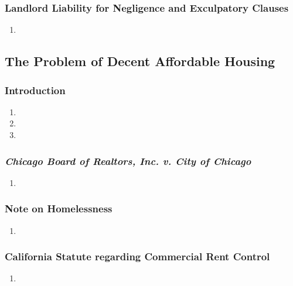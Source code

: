 \subsubsection{Landlord Liability for Negligence and Exculpatory Clauses}

\begin{enumerate}
    \item
\end{enumerate}

\subsection{The Problem of Decent Affordable Housing} %

\subsubsection{Introduction} %

\begin{enumerate}
    \item %
    \item %
    \item %
\end{enumerate}

\subsubsection{\emph{Chicago Board of Realtors, Inc. v. City of Chicago}}

\begin{enumerate}
    \item 
\end{enumerate}

\subsubsection{Note on Homelessness}

\begin{enumerate}
    \item 
\end{enumerate}

\subsubsection{California Statute regarding Commercial Rent Control}

\begin{enumerate}
    \item 
\end{enumerate}

